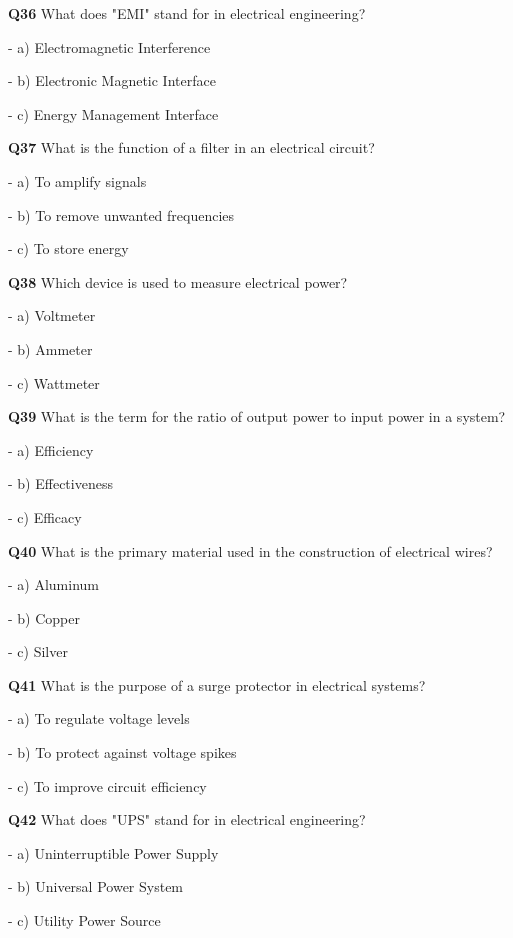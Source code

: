 \textbf{Q36} What does "EMI" stand for in electrical engineering?\par
\quad - a) Electromagnetic Interference\par
\quad - b) Electronic Magnetic Interface\par
\quad - c) Energy Management Interface\par

\textbf{Q37} What is the function of a filter in an electrical circuit?\par
\quad - a) To amplify signals\par
\quad - b) To remove unwanted frequencies\par
\quad - c) To store energy\par

\textbf{Q38} Which device is used to measure electrical power?\par
\quad - a) Voltmeter\par
\quad - b) Ammeter\par
\quad - c) Wattmeter\par

\textbf{Q39} What is the term for the ratio of output power to input power in a system?\par
\quad - a) Efficiency\par
\quad - b) Effectiveness\par
\quad - c) Efficacy\par

\textbf{Q40} What is the primary material used in the construction of electrical wires?\par
\quad - a) Aluminum\par
\quad - b) Copper\par
\quad - c) Silver\par

\textbf{Q41} What is the purpose of a surge protector in electrical systems?\par
\quad - a) To regulate voltage levels\par
\quad - b) To protect against voltage spikes\par
\quad - c) To improve circuit efficiency\par

\textbf{Q42} What does "UPS" stand for in electrical engineering?\par
\quad - a) Uninterruptible Power Supply\par
\quad - b) Universal Power System\par
\quad - c) Utility Power Source\par

